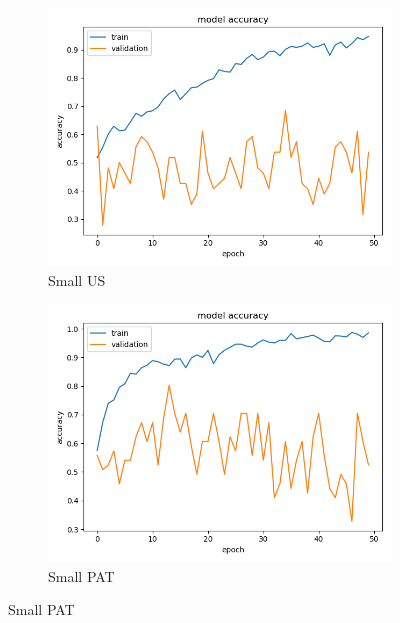 \begin{figure}
\centering
\begin{subfigure}[b]{.45\linewidth}
\includegraphics[width=\linewidth]{Figs/small_us_acc.jpg}
\caption{Small US}
\end{subfigure}
\begin{subfigure}[b]{.45\linewidth}
\includegraphics[width=\linewidth]{Figs/small_pat_acc.jpg}
\caption{Small PAT}
\end{subfigure}


\end{figure}
